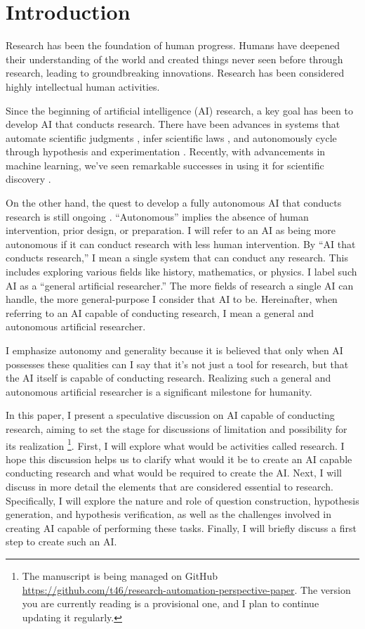 \section{Introduction}
Research has been the foundation of human progress. Humans have deepened their understanding of the world and created things never seen before through research, leading to groundbreaking innovations. Research has been considered highly intellectual human activities.

Since the beginning of artificial intelligence (AI) research, a key goal has been to develop AI that conducts research. There have been advances in systems that automate scientific judgments \cite{lindsay1993dendral}, infer scientific laws \cite{langley1987scientific}, and autonomously cycle through hypothesis and experimentation \cite{king2004functional}. Recently, with advancements in machine learning, we've seen remarkable successes in using it for scientific discovery \cite{wang2023scientific,xu2021artificial,zhang2023artificial}.

On the other hand, the quest to develop a fully autonomous AI that conducts research is still ongoing \cite{zenil2023}. ``Autonomous'' implies the absence of human intervention, prior design, or preparation. I will refer to an AI as being more autonomous if it can conduct research with less human intervention. By ``AI that conducts research,'' I mean a single system that can conduct any research. This includes exploring various fields like history, mathematics, or physics. I label such AI as a ``general artificial researcher.'' The more fields of research a single AI can handle, the more general-purpose I consider that AI to be. Hereinafter, when referring to an AI capable of conducting research, I mean a general and autonomous artificial researcher.

I emphasize autonomy and generality because it is believed that only when AI possesses these qualities can I say that it's not just a tool for research, but that the AI itself is capable of conducting research. Realizing such a general and autonomous artificial researcher is a significant milestone for humanity.

In this paper, I present a speculative discussion on AI capable of conducting research, aiming to set the stage for discussions of limitation and possibility for its realization \footnote{
The manuscript is being managed on GitHub \url{https://github.com/t46/research-automation-perspective-paper}. The version you are currently reading is a provisional one, and I plan to continue updating it regularly.
}. 
First, I will explore what would be activities called research. I hope this discussion helps us to clarify what would it be to create an AI capable conducting research and what would be required to create the AI. Next, I will discuss in more detail the elements that are considered essential to research. Specifically, I will explore the nature and role of question construction, hypothesis generation, and hypothesis verification, as well as the challenges involved in creating AI capable of performing these tasks. Finally, I will briefly discuss a first step to create such an AI.